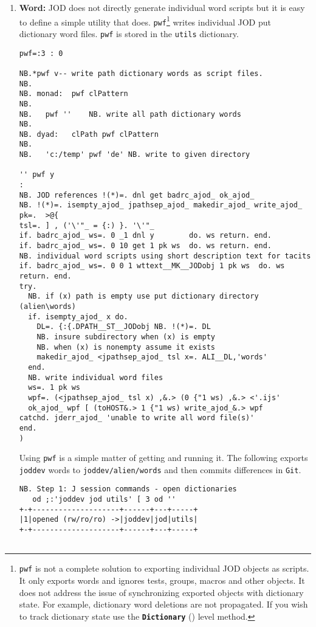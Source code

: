 \begin{enumerate}
\item \textbf{Word:} JOD does not directly generate individual word scripts 
but it is easy to define
a simple utility that does. \texttt{pwf}\footnote{
\texttt{pwf} is not a complete solution to exporting 
individual JOD objects as scripts. It only exports words
 and ignores tests, groups, macros and other objects.
It does not address the issue of synchronizing exported
objects with dictionary state. For example, dictionary word
deletions are not propagated. If you wish to track 
dictionary state use the \textbf{\texttt{Dictionary}} (\pageref{it:dictlev})
level method.}
writes individual JOD put dictionary
word files. \texttt{pwf} is stored in the \texttt{utils} dictionary.

\begin{lstlisting}[frame=single,framerule=0pt,basicstyle=\ttfamily\footnotesize]
pwf=:3 : 0

NB.*pwf v-- write path dictionary words as script files.
NB.
NB. monad:  pwf clPattern
NB.
NB.   pwf ''    NB. write all path dictionary words
NB.
NB. dyad:   clPath pwf clPattern
NB.
NB.   'c:/temp' pwf 'de' NB. write to given directory

'' pwf y
:
NB. JOD references !(*)=. dnl get badrc_ajod_ ok_ajod_ 
NB. !(*)=. isempty_ajod_ jpathsep_ajod_ makedir_ajod_ write_ajod_
pk=.  >@{                        
tsl=. ] , ('\'"_ = {:) }. '\'"_  
if. badrc_ajod_ ws=. 0 _1 dnl y        do. ws return. end.
if. badrc_ajod_ ws=. 0 10 get 1 pk ws  do. ws return. end.
NB. individual word scripts using short description text for tacits
if. badrc_ajod_ ws=. 0 0 1 wttext__MK__JODobj 1 pk ws  do. ws return. end.
try.
  NB. if (x) path is empty use put dictionary directory (alien\words)
  if. isempty_ajod_ x do.
    DL=. {:{.DPATH__ST__JODobj NB. !(*)=. DL
    NB. insure subdirectory when (x) is empty
    NB. when (x) is nonempty assume it exists
    makedir_ajod_ <jpathsep_ajod_ tsl x=. ALI__DL,'words'
  end.
  NB. write individual word files
  ws=. 1 pk ws
  wpf=. (<jpathsep_ajod_ tsl x) ,&.> (0 {"1 ws) ,&.> <'.ijs'
  ok_ajod_ wpf [ (toHOST&.> 1 {"1 ws) write_ajod_&.> wpf
catchd. jderr_ajod_ 'unable to write all word file(s)'
end.
)
\end{lstlisting}

Using \texttt{pwf} is a simple matter of getting and running it.  The following
exports  \texttt{joddev} words  to \verb|joddev/alien/words| 
and then commits differences in \texttt{Git}.

\begin{lstlisting}[frame=single,framerule=0pt,basicstyle=\ttfamily\footnotesize]
   NB. Step 1: J session commands - open dictionaries
   od ;:'joddev jod utils' [ 3 od ''
+-+--------------------+------+---+-----+
|1|opened (rw/ro/ro) ->|joddev|jod|utils|
+-+--------------------+------+---+-----+


\end{lstlisting}
\end{enumerate}
